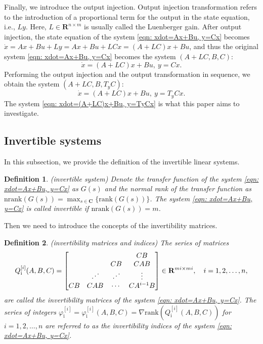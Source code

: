 \documentclass[sort&compress]{elsarticle}
\newtheorem{definition}{Definition}
\newcommand\adots{\mathinner{\mkern2mu%
	\raisebox{0.1em}{.}\mkern2mu\raisebox{0.4em}{.}%
	\mkern2mu\raisebox{0.7em}{.}\mkern1mu}}
\newcommand\faii{\varphi_\mathrm i}
\newcommand\Qi{Q_\mathrm i}
\newcommand\rank{\mathrm{rank}}
\newcommand\R{\mathbf R}
\begin{document}
Finally, we introduce the output injection.
Output injection transformation refers to the introduction of
a proportional term for the output in the state equation,
i.e., $Ly$.
Here, $L\in\R^{n\times m}$ is usually called the Luenberger gain.
After output injection, the state equation of
the system \eqref{eqn: xdot=Ax+Bu, y=Cx} becomes
$\dot x=Ax+Bu+Ly=Ax+Bu+LCx=(A+LC)x+Bu$,
and thus the original system \eqref{eqn: xdot=Ax+Bu, y=Cx}
becomes the system $(A+LC,B,C)$:
\begin{equation*}
\dot x=(A+LC)x+Bu,\ y=Cx.
\end{equation*}
Performing the output injection and the output transformation in sequence,
we obtain the system $(A+LC,B,T_yC)$:
\begin{equation}\label{eqn: xdot=(A+LC)x+Bu, y=TyCx}
\dot x=(A+LC)x+Bu,\ y=T_yCx.
\end{equation}
The system \eqref{eqn: xdot=(A+LC)x+Bu, y=TyCx}
is what this paper aims to investigate.

\subsection{Invertible systems}

In this subsection,
we provide the definition of the invertible linear systems.

\begin{definition}\emph{(invertible system)}
Denote the transfer function of the system \eqref{eqn: xdot=Ax+Bu, y=Cx}
as $G(s)$ and the normal rank of the transfer function as
$\mathrm{nrank}(G(s))=\max_{s\in\mathbf C}\{\rank(G(s))\}$.
The system \eqref{eqn: xdot=Ax+Bu, y=Cx} is called invertible
if $\mathrm{nrank}(G(s))=m$.
\end{definition}

Then we need to introduce the concepts of
the invertibility matrices.

\begin{definition}
\emph{\cite{Zhoubook,Zhou2024IJC[J]}
(invertibility matrices and indices)}
The series of matrices
\[
\Qi^{[i]}(A,B,C)
=\begin{bmatrix}
&&&CB\\
&&CB&CAB\\
&\adots&\adots&\vdots\\
CB&CAB&\cdots&CA^{i-1}B
\end{bmatrix}
\in\R^{mi\times mi},
\quad i=1,2,\dots,n,
\]
are called the invertibility matrices of the system \eqref{eqn: xdot=Ax+Bu, y=Cx}.
The series of integers
$\faii^{[i]}=\faii^{[i]}(A,B,C)=\nabla\rank(\Qi^{[i]}(A,B,C))$
for $i=1,2,\dots,n$
are referred to as the invertibility indices of
the system \eqref{eqn: xdot=Ax+Bu, y=Cx}.
\end{definition}
\end{document}

